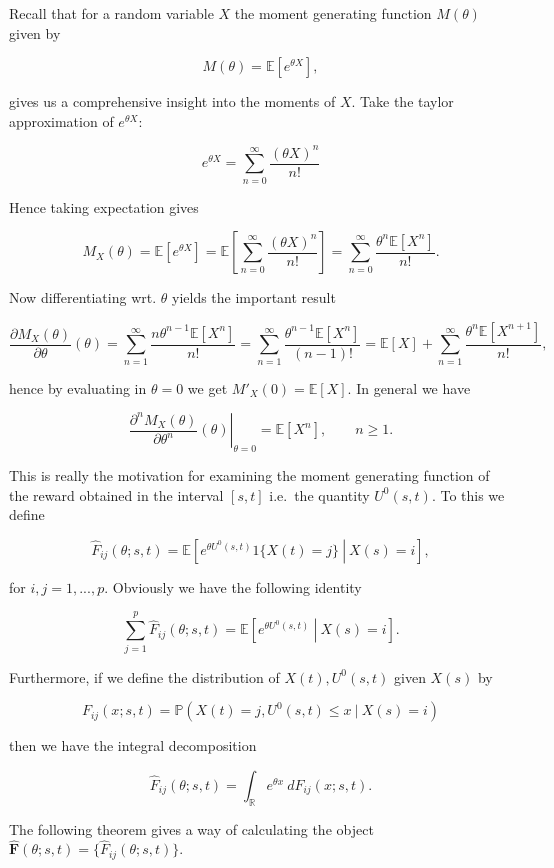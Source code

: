 \documentclass[a4paper,10pt,openany]{book}
\begin{document}
Recall that for a random variable \(X\) the moment generating function \(M(\theta)\) given by

\[
M(\theta)=\mathbb E[e^{\theta X}],
\]

gives us a comprehensive insight into the moments of \(X\). Take the taylor approximation of \(e^{\theta X}\):

\[
e^{\theta X}=\sum_{n=0}^\infty\frac{(\theta X)^n}{n!}
\]

Hence taking expectation gives

\[
M_X(\theta)=\mathbb E[e^{\theta X}]=\mathbb E\left[\sum_{n=0}^\infty\frac{(\theta X)^n}{n!}\right]=\sum_{n=0}^\infty\frac{\theta^n \mathbb E[X^n]}{n!}.
\]

Now differentiating wrt. \(\theta\) yields the important result

\[
\frac{\partial M_X(\theta)}{\partial \theta}(\theta)=\sum_{n=1}^\infty\frac{n\theta^{n-1} \mathbb E[X^n]}{n!}=\sum_{n=1}^\infty\frac{\theta^{n-1} \mathbb E[X^n]}{(n-1)!}=\mathbb E[X]+\sum_{n=1}^\infty\frac{\theta^{n} \mathbb E[X^{n+1}]}{n!},
\]

hence by evaluating in \(\theta = 0\) we get \(M'_X(0)=\mathbb E[X]\). In general we have

\[
\left.\frac{\partial^n M_X(\theta)}{\partial \theta^n}(\theta)\right\vert_{\theta = 0}=\mathbb E[X^n],\qquad n\ge 1.
\]

This is really the motivation for examining the moment generating function of the reward obtained in the interval \([s,t]\) i.e.~the quantity \(U^0(s,t)\). To this we define

\[
\hat F_{ij}(\theta;s,t)=\mathbb E\left[\left.e^{\theta U^0(s,t)}1\{X(t)=j\}\ \right\vert\ X(s)=i\right],
\]

for \(i,j=1,...,p\). Obviously we have the following identity

\[
\sum_{j=1}^p\hat F_{ij}(\theta;s,t)=\mathbb E\left[\left.e^{\theta U^0(s,t)}\ \right\vert\ X(s)=i\right].
\]

Furthermore, if we define the distribution of \(X(t),U^0(s,t)\) given \(X(s)\) by

\[
F_{ij}(x; s,t)=\mathbb P(X(t)=j,U^0(s,t)\le x\ \vert\ X(s)=i)
\]

then we have the integral decomposition

\[
\hat F_{ij}(\theta; s,t)=\int_{\mathbb R} e^{\theta x}\ dF_{ij}(x; s,t).
\]

The following theorem gives a way of calculating the object \(\hat{\mathbf F}(\theta; s,t)=\{\hat F_{ij}(\theta; s,t)\}\).
\end{document}
